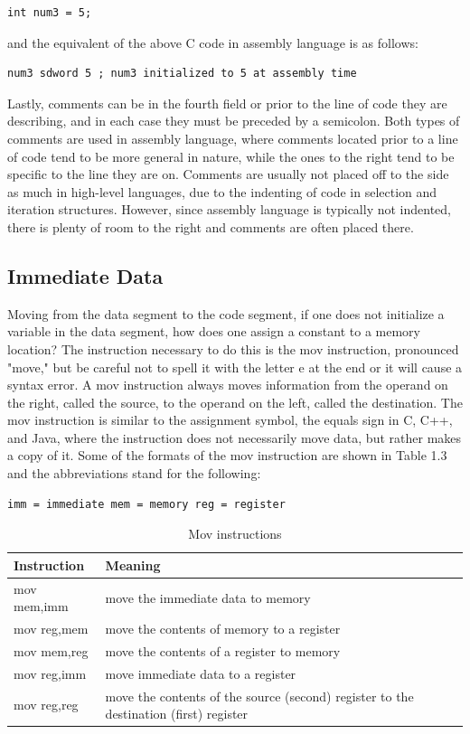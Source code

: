 \documentclass[10pt]{book}
\begin{document}
\begin{verbatim}
int num3 = 5;
\end{verbatim}

and the equivalent of the above C code in assembly language is as follows:

\begin{verbatim}
num3 sdword 5 ; num3 initialized to 5 at assembly time
\end{verbatim}

Lastly, comments can be in the fourth field or prior to the line of code they are describing, and in each case they must be preceded by a semicolon. Both types of comments are used in assembly language, where comments located prior to a line of code tend to be more general in nature, while the ones to the right tend to be specific to the line they are on. Comments are usually not placed off to the side as much in high-level languages, due to the indenting of code in selection and iteration structures. However, since assembly language is typically not indented, there is plenty of room to the right and comments are often placed there.

\subsection{Immediate Data}
Moving from the data segment to the code segment, if one does not initialize a variable in the data segment, how does one assign a constant to a memory location? The instruction necessary to do this is the mov instruction, pronounced "move," but be careful not to spell it with the letter e at the end or it will cause a syntax error. A mov instruction always moves information from the operand on the right, called the source, to the operand on the left, called the destination. The mov instruction is similar to the assignment symbol, the equals sign in C, C++, and Java, where the instruction does not necessarily move data, but rather makes a copy of it. Some of the formats of the mov instruction are shown in Table 1.3 and the abbreviations stand for the following:

\begin{verbatim}
imm = immediate mem = memory reg = register
\end{verbatim}

\begin{table}[t]
\centering
\begin{tabular}{|l|p{}|}
\hline
Instruction & Meaning \\
\hline
mov mem,imm & move the immediate data to memory \\
\hline
mov reg,mem & move the contents of memory to a register \\
\hline
mov mem,reg & move the contents of a register to memory \\
\hline
mov reg,imm & move immediate data to a register \\
\hline
mov reg,reg & move the contents of the source (second) register to the destination (first) register \\
\hline
\end{tabular}
\caption{Mov instructions}
\end{table}
\end{document}
